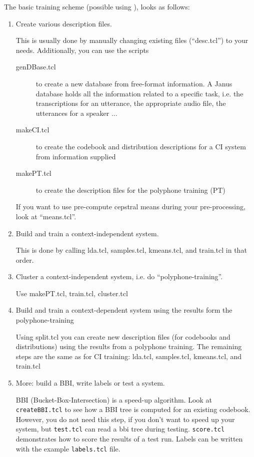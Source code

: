 The basic training scheme (possible using ),
looks as follows:

\begin{enumerate}

\item Create various description files.

  This is usually done by manually changing existing files
  (``desc.tcl'') to your needs. Additionally, you can use the scripts 

  \begin{description}
  \item[genDBase.tcl] to create a new database from free-format
    information. A Janus database holds all the information related
    to a specific task, i.e. the transcriptions for an utterance,
    the appropriate audio file, the utterances for a speaker ...
  \item[makeCI.tcl] to create the codebook and distribution
    descriptions for a CI system from information supplied 
  \item[makePT.tcl] to create the description files for the polyphone
    training (PT) 
  \end{description}

  If you want to use pre-compute cepstral means during your
  pre-processing, look at ``means.tcl''.

\item Build and train a context-independent system.

  This  is done by calling lda.tcl, samples.tcl, kmeans.tcl, and
  train.tcl in that order.

\item Cluster a context-independent system, i.e. do ``polyphone-training''.

  Use makePT.tcl, train.tcl, cluster.tcl

\item Build and train a context-dependent system using the
  results form the polyphone-training

  Using split.tcl you can create new description files (for codebooks
  and distributions) using the results from a polyphone training. The
  remaining steps are the same as for CI training: lda.tcl,
  samples.tcl, kmeans.tcl, and train.tcl

\item More: build a BBI, write labels or test a system.

  BBI (Bucket-Box-Intersection)   is  a speed-up  algorithm.   Look at
  \texttt{createBBI.tcl} to see  how  a BBI  tree is  computed for  an
  existing codebook. However, you do not  need this step, if you don't
  want to speed  up your system,  but \texttt{test.tcl} can read a bbi
  tree during  testing.  \texttt{score.tcl} demonstrates how  to score
  the results of  a test run.  Labels can be  written with the example
  \texttt{labels.tcl} file.

\end{enumerate}

